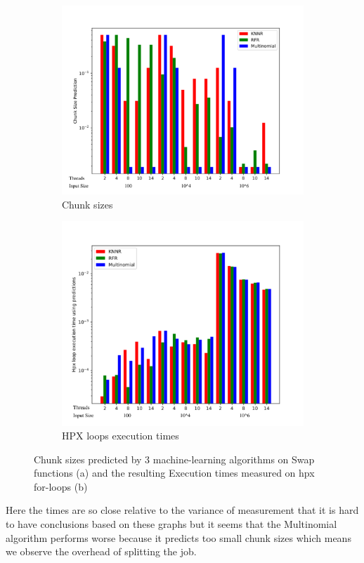 \begin{figure}[h]
	\centering
	\begin{subfigure}[b]{0.5\textwidth}
		\centering
		\includegraphics[width=\textwidth]{images/bars_Swap_cs.pdf}
		\caption[Network2]%
		{{Chunk sizes}}    
	\end{subfigure}
	\hfill
	\begin{subfigure}[b]{0.49\textwidth}  
		\centering 
		\includegraphics[width=\textwidth]{images/bars_Swap_times.pdf}
		\caption[]%
		{{HPX loops execution times}}    
	\end{subfigure}
	\caption{Chunk sizes predicted by 3 machine-learning algorithms on Swap functions (a) and the resulting Execution times measured on hpx for-loops (b)} 
\end{figure}
Here the times are so close relative to the variance of measurement that it is hard to have conclusions based on these graphs but it seems that the Multinomial algorithm performs worse because it predicts too small chunk sizes which means we observe the overhead of splitting the job.
\newpage
